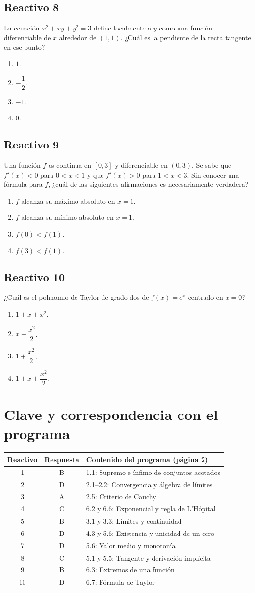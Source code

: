 \documentclass[11pt,a4paper]{article}
\newif\ifsoluciones
\newenvironment{alternativas}{%
  \begin{enumerate}\renewcommand{\labelenumi}{\Alph{enumi})}%
  \setlength{\itemsep}{3pt}\setlength{\parskip}{0pt}%
}{\end{enumerate}}
\newcommand{\reactivo}[2]{\subsection*{Reactivo #1}\noindent #2\par}
\begin{document}
\reactivo{8}{La ecuación $x^2+xy+y^2=3$ define localmente a $y$ como una
función diferenciable de $x$ alrededor de $(1,1)$. ¿Cuál es la pendiente de
la recta tangente en ese punto?}
\begin{alternativas}
  \item $1$.
  \item $-\dfrac{1}{2}$.
  \item $-1$.
  \item $0$.
\end{alternativas}

\reactivo{9}{Una función $f$ es continua en $[0,3]$ y diferenciable en $(0,3)$.
Se sabe que $f'(x)<0$ para $0<x<1$ y que $f'(x)>0$ para $1<x<3$.
Sin conocer una fórmula para $f$, ¿cuál de las siguientes afirmaciones
es necesariamente verdadera?}
\begin{alternativas}
\item $f$ alcanza su máximo absoluto en $x=1$.
    \item $f$ alcanza su mínimo absoluto en $x=1$.
    \item $f(0)<f(1)$.
    \item $f(3)<f(1)$.
\end{alternativas}

\reactivo{10}{¿Cuál es el polinomio de Taylor de grado dos de $f(x)=e^x$
centrado en $x=0$?}
\begin{alternativas}
  \item $1+x+x^2$.
  \item $x+\dfrac{x^2}{2}$.
  \item $1+\dfrac{x^2}{2}$.
  \item $1+x+\dfrac{x^2}{2}$.
\end{alternativas}

\ifsoluciones
\clearpage
\section*{Clave y correspondencia con el programa}

\begin{center}
\begin{tabular}{ccl}
\hline
Reactivo & Respuesta & Contenido del programa (página 2)\\
\hline
1 & B & 1.1: Supremo e ínfimo de conjuntos acotados\\
2 & D & 2.1--2.2: Convergencia y álgebra de límites\\
3 & A & 2.5: Criterio de Cauchy\\
4 & C & 6.2 y 6.6: Exponencial y regla de L'Hópital\\
5 & B & 3.1 y 3.3: Límites y continuidad\\
6 & D & 4.3 y 5.6: Existencia y unicidad de un cero\\
7 & D & 5.6: Valor medio y monotonía\\
8 & C & 5.1 y 5.5: Tangente y derivación implícita\\
9 & B & 6.3: Extremos de una función\\
10 & D & 6.7: Fórmula de Taylor\\
\hline
\end{tabular}
\end{center}
\end{document}
